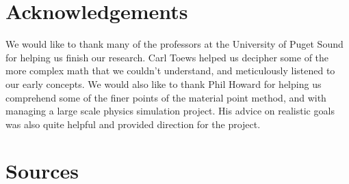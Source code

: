 \documentclass{acm_proc_article-sp}
\begin{document}
\section{Acknowledgements}
We would like to thank many of the professors at the University of Puget Sound for helping us finish our research. Carl Toews helped us decipher some of the more complex math that we couldn’t understand, and meticulously listened to our early concepts. We would also like to thank Phil Howard for helping us comprehend some of the finer points of the material point method, and with managing a large scale physics simulation project. His advice on realistic goals was also quite helpful and provided direction for the project.

\section{Sources}
\end{document}
